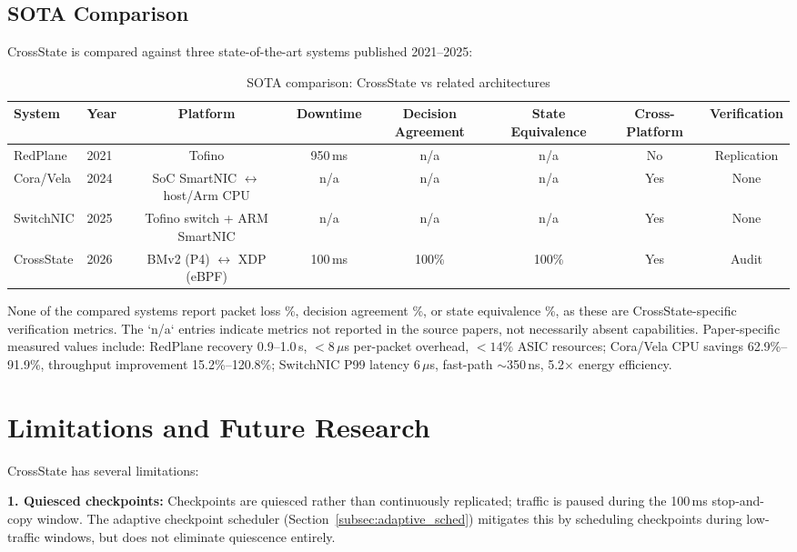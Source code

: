 \documentclass[10pt, conference]{IEEEtran}
\begin{document}
\subsection{SOTA Comparison}
\label{subsec:sota}
CrossState is compared against three state-of-the-art systems published 2021--2025:

\begin{table}[htbp]
\centering
\footnotesize
\caption{SOTA comparison: CrossState vs related architectures}
\label{tab:sota}
\begin{tabular}{@{}llcccccc@{}}
\toprule
System & Year & Platform & Downtime & Decision Agreement & State Equivalence & Cross-Platform & Verification \\
\midrule
RedPlane & 2021 & Tofino & 950\,ms & n/a & n/a & No & Replication \\
Cora/Vela & 2024 & SoC SmartNIC $\leftrightarrow$ host/Arm CPU & n/a & n/a & n/a & Yes & None \\
SwitchNIC & 2025 & Tofino switch + ARM SmartNIC & n/a & n/a & n/a & Yes & None \\
CrossState & 2026 & BMv2 (P4) $\leftrightarrow$ XDP (eBPF) & 100\,ms & 100\% & 100\% & Yes & Audit \\
\bottomrule
\end{tabular}
\end{table}

None of the compared systems report packet loss \%, decision agreement \%, or state equivalence \%, as these are CrossState-specific verification metrics. The `n/a` entries indicate metrics not reported in the source papers, not necessarily absent capabilities. Paper-specific measured values include: RedPlane recovery 0.9--1.0\,s, $<8\,\mu$s per-packet overhead, $<14\%$ ASIC resources; Cora/Vela CPU savings 62.9\%--91.9\%, throughput improvement 15.2\%--120.8\%; SwitchNIC P99 latency 6\,$\mu$s, fast-path $\sim$350\,ns, 5.2$\times$ energy efficiency.

\section{Limitations and Future Research}
\label{sec:limitations}
CrossState has several limitations:

\textbf{1. Quiesced checkpoints:} Checkpoints are quiesced rather than continuously replicated; traffic is paused during the 100\,ms stop-and-copy window. The adaptive checkpoint scheduler (Section~\ref{subsec:adaptive_sched}) mitigates this by scheduling checkpoints during low-traffic windows, but does not eliminate quiescence entirely.
\end{document}
